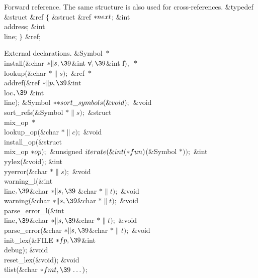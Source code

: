 Forward reference. The same structure is also used for cross-references.
\Y\B\&{typedef} \&{struct} \&{ref} ${}\{{}$\1\6
\&{struct} \&{ref} ${}{*}\\{next}{}$;\6
\&{int} \\{address};\6
\&{int} \\{line};\2\6
${}\}{}$ \&{ref};\par
\fi

External declarations.
\Y\B\&{Symbol} ${}{*}{}$\\{install}(\&{char} ${}{*}\|s,\39{}$\&{int} \|v${},%
\39{}$\&{int} \|l)${},{}$ ${}{*}{}$\\{lookup}(\&{char} ${}{*}\|s);{}$\6
\&{ref} ${}{*}{}$\\{addref}(\&{ref} ${}{*}\|p,\39{}$\&{int} \\{loc}${},\39{}$%
\&{int} \\{line});\6
\&{Symbol} ${}{*}{*}\\{sort\_symbols}(\&{void});{}$\6
\&{void} \\{sort\_refs}(\&{Symbol} ${}{*}\|s);{}$\6
\&{struct} \\{mix\_op} ${}{*}{}$\\{lookup\_op}(\&{char} ${}{*}\|c);{}$\6
\&{void} \\{install\_op}(\&{struct} \\{mix\_op} ${}{*}\\{op});{}$\6
\&{unsigned} ${}\\{iterate}(\&{int}({*}\\{fun}){}$(\&{Symbol} ${}{*}));{}$\6
\&{int} \\{yylex}(\&{void});\6
\&{int} \\{yyerror}(\&{char} ${}{*}\|s);{}$\6
\&{void} \\{warning\_l}(\&{int} \\{line}${},\39{}$\&{char} ${}{*}\|s,\39{}$%
\&{char} ${}{*}\|t);{}$\6
\&{void} \\{warning}(\&{char} ${}{*}\|s,\39{}$\&{char} ${}{*}\|t);{}$\6
\&{void} \\{parse\_error\_l}(\&{int} \\{line}${},\39{}$\&{char} ${}{*}\|s,%
\39{}$\&{char} ${}{*}\|t);{}$\6
\&{void} \\{parse\_error}(\&{char} ${}{*}\|s,\39{}$\&{char} ${}{*}\|t);{}$\6
\&{void} \\{init\_lex}(\&{FILE} ${}{*}\\{fp},\39{}$\&{int} \\{debug});\6
\&{void} \\{reset\_lex}(\&{void});\6
\&{void} \\{tlist}(\&{char} ${}{*}\\{fmt},\39\,\ldots\,){}$;\par
\fi


\inx
\fin
\con
